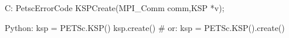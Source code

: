 C:
PetscErrorCode KSPCreate(MPI_Comm comm,KSP *v);

Python:
ksp = PETSc.KSP()
ksp.create()
# or:
ksp = PETSc.KSP().create()

